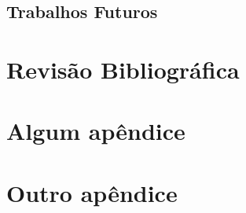 \documentclass{../ufpatcc}
\begin{document}
		\section{Trabalhos Futuros}

  \chapter{Revisão Bibliográfica}
    \lipsum[1]\cite{atalholivro}
    \lipsum[2]\cite{atalhoonline}


  \appendix
    \chapter{Algum apêndice}
    \chapter{Outro apêndice}

  
\end{document}
